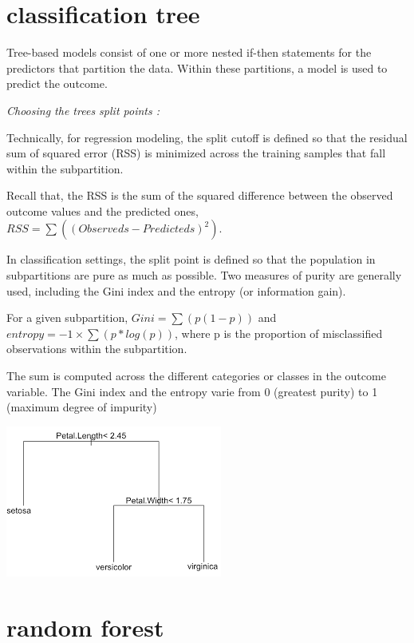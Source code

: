 \documentclass[
]{report}
\begin{document}
\hypertarget{classification-tree}{%
\section{classification tree}\label{classification-tree}}

Tree-based models consist of one or more nested if-then statements for the predictors that partition the data. Within these partitions, a model is used to predict the outcome.

\emph{Choosing the trees split points :}

Technically, for regression modeling, the split cutoff is defined so that the residual sum of squared error (RSS) is minimized across the training samples that fall within the subpartition.

Recall that, the RSS is the sum of the squared difference between the observed outcome values and the predicted ones, \(RSS = \sum((Observeds - Predicteds)^2)\).

In classification settings, the split point is defined so that the population in subpartitions are pure as much as possible. Two measures of purity are generally used, including the Gini index and the entropy (or information gain).

For a given subpartition, \(Gini = \sum(p(1-p))\) and \(entropy = -1\times \sum(p*log(p))\), where p is the proportion of misclassified observations within the subpartition.

The sum is computed across the different categories or classes in the outcome variable. The Gini index and the entropy varie from 0 (greatest purity) to 1 (maximum degree of impurity)

\begin{center}\includegraphics{tree} \end{center}

\hypertarget{random-forest}{%
\section{random forest}\label{random-forest}}
\end{document}
